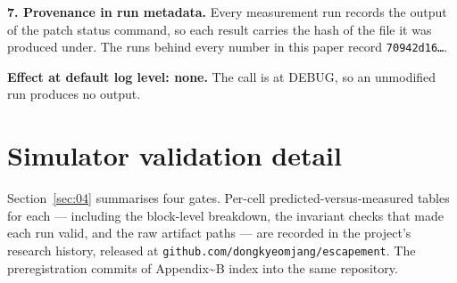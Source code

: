\textbf{7. Provenance in run metadata.} Every measurement run records the output of the patch status command, so each result carries the hash of the file it was produced under. The runs behind every number in this paper record \texttt{70942d16\ldots{}}.

\textbf{Effect at default log level: none.} The call is at DEBUG, so an unmodified run produces no output.

\section{Simulator validation detail}

Section~\ref{sec:04} summarises four gates. Per-cell predicted-versus-measured tables for each --- including the block-level breakdown, the invariant checks that made each run valid, and the raw artifact paths --- are recorded in the project's research history, released at \texttt{github.\allowbreak{}com/\allowbreak{}dongkyeomjang/\allowbreak{}escapement}. The preregistration commits of Appendix\textasciitilde{}B index into the same repository.
